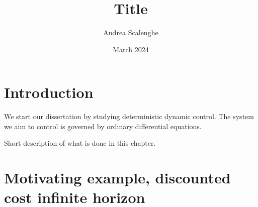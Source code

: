 \documentclass[12pt,a4paper]{book}
\title{Title}
\author{Andrea Scalenghe}
\date{March 2024}
\numberwithin{theorem}{section}
\numberwithin{definition}{section}
\numberwithin{example}{section}
\numberwithin{exercise}{section}
\begin{document}

\section{Introduction}

We start our dissertation by studying deterministic dynamic control. The system we aim to control is governed by ordinary differential equations. 

Short description of what is done in this chapter.

\section{Motivating example, discounted cost infinite horizon} %











% 






\end{document}
